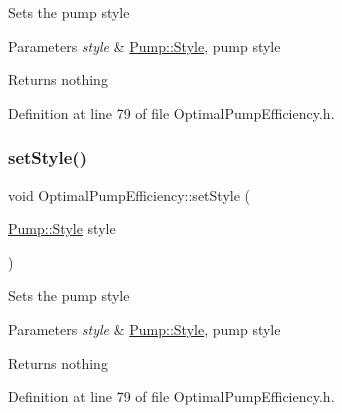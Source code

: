 Sets the pump style


\begin{DoxyParams}{Parameters}
{\em style} & \hyperlink{class_pump_aef354601ce4218258cc898b35a1e90ff}{Pump\+::\+Style}, pump style\\
\hline
\end{DoxyParams}
\begin{DoxyReturn}{Returns}
nothing 
\end{DoxyReturn}


Definition at line 79 of file Optimal\+Pump\+Efficiency.\+h.

\mbox{\label{class_optimal_pump_efficiency_ab6b85c8c08d6641c5375c65436f16a2f}} 
\subsubsection{\texorpdfstring{set\+Style()}{setStyle()}\hspace{0.1cm}{\footnotesize\ttfamily [2/3]}}
{\footnotesize\ttfamily void Optimal\+Pump\+Efficiency\+::set\+Style (\begin{DoxyParamCaption}\item[{\hyperlink{class_pump_aef354601ce4218258cc898b35a1e90ff}{Pump\+::\+Style}}]{style }\end{DoxyParamCaption})\hspace{0.3cm}{\ttfamily [inline]}}

Sets the pump style


\begin{DoxyParams}{Parameters}
{\em style} & \hyperlink{class_pump_aef354601ce4218258cc898b35a1e90ff}{Pump\+::\+Style}, pump style\\
\hline
\end{DoxyParams}
\begin{DoxyReturn}{Returns}
nothing 
\end{DoxyReturn}


Definition at line 79 of file Optimal\+Pump\+Efficiency.\+h.

\mbox{\label{class_optimal_pump_efficiency_ab6b85c8c08d6641c5375c65436f16a2f}} 
